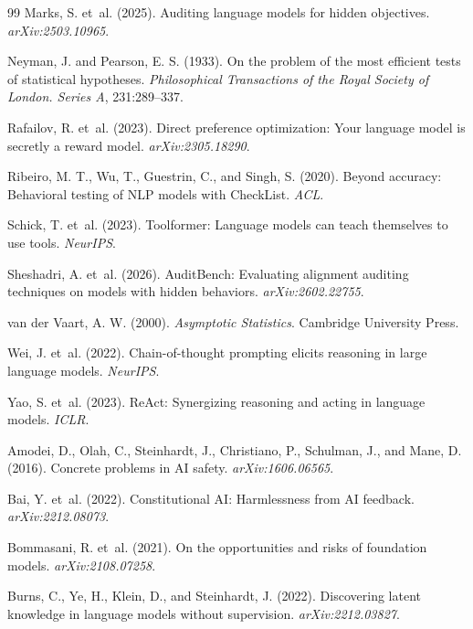 \documentclass{article}
\begin{document}
\begin{thebibliography}{99}
Marks, S. et~al. (2025). Auditing language models for hidden objectives. \emph{arXiv:2503.10965}.

Neyman, J. and Pearson, E. S. (1933). On the problem of the most efficient tests of statistical hypotheses. \emph{Philosophical Transactions of the Royal Society of London. Series A}, 231:289--337.

Rafailov, R. et~al. (2023). Direct preference optimization: Your language model is secretly a reward model. \emph{arXiv:2305.18290}.

Ribeiro, M. T., Wu, T., Guestrin, C., and Singh, S. (2020). Beyond accuracy: Behavioral testing of NLP models with CheckList. \emph{ACL}.

Schick, T. et~al. (2023). Toolformer: Language models can teach themselves to use tools. \emph{NeurIPS}.

Sheshadri, A. et~al. (2026). AuditBench: Evaluating alignment auditing techniques on models with hidden behaviors. \emph{arXiv:2602.22755}.

van der Vaart, A. W. (2000). \emph{Asymptotic Statistics}. Cambridge University Press.

Wei, J. et~al. (2022). Chain-of-thought prompting elicits reasoning in large language models. \emph{NeurIPS}.

Yao, S. et~al. (2023). ReAct: Synergizing reasoning and acting in language models. \emph{ICLR}.


Amodei, D., Olah, C., Steinhardt, J., Christiano, P., Schulman, J., and Mane, D. (2016). Concrete problems in AI safety. \emph{arXiv:1606.06565}.

Bai, Y. et~al. (2022). Constitutional AI: Harmlessness from AI feedback. \emph{arXiv:2212.08073}.

Bommasani, R. et~al. (2021). On the opportunities and risks of foundation models. \emph{arXiv:2108.07258}.

Burns, C., Ye, H., Klein, D., and Steinhardt, J. (2022). Discovering latent knowledge in language models without supervision. \emph{arXiv:2212.03827}.


\end{thebibliography}
\end{document}
